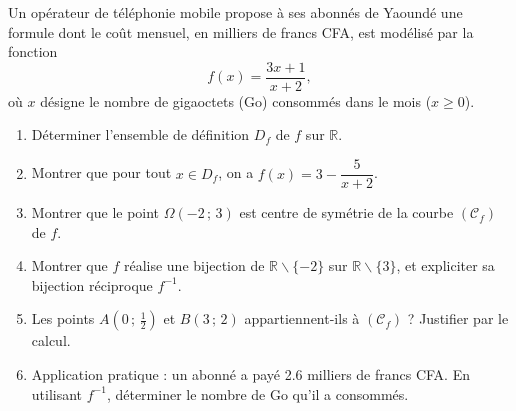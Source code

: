 \documentclass[11pt]{article}
\def\setminus{\mathbin{\backslash}}\let\smallsetminus\setminus
\begin{document}
\begin{exercice}
Un opérateur de téléphonie mobile propose à ses abonnés de Yaoundé une formule dont le coût mensuel, en milliers de francs CFA, est modélisé par la fonction
\[ f(x)=\frac{3x+1}{x+2}, \]
où $x$ désigne le nombre de gigaoctets (Go) consommés dans le mois ($x\geq 0$).
\begin{enumerate}
\item Déterminer l'ensemble de définition $D_f$ de $f$ sur $\mathbb{R}$.
\item Montrer que pour tout $x\in D_f$, on a $f(x)=3-\dfrac{5}{x+2}$.
\item Montrer que le point $\Omega(-2\,;\,3)$ est centre de symétrie de la courbe $(\mathcal{C}_f)$ de $f$.
\item Montrer que $f$ réalise une bijection de $\mathbb{R}\setminus\{-2\}$ sur $\mathbb{R}\setminus\{3\}$, et expliciter sa bijection réciproque $f^{-1}$.
\item Les points $A(0\,;\,\tfrac{1}{2})$ et $B(3\,;\,2)$ appartiennent-ils à $(\mathcal{C}_f)$ ? Justifier par le calcul.
\item Application pratique : un abonné a payé \num{2,6} milliers de francs CFA. En utilisant $f^{-1}$, déterminer le nombre de Go qu'il a consommés.
\end{enumerate}
\end{exercice}
\end{document}

